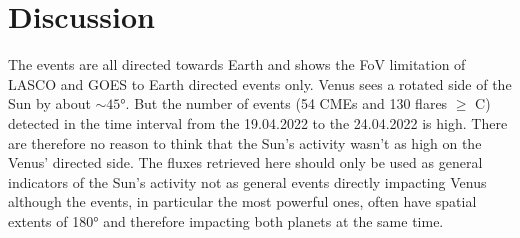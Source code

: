 \section{Discussion}

The events are all directed towards Earth and shows the FoV limitation of LASCO and GOES to Earth directed events only. Venus sees a rotated side of the Sun by about $\sim 45$°. But the number of events (54 CMEs and 130 flares $\geq$ C) detected in the time interval from the 19.04.2022 to the 24.04.2022 is high. There are therefore no reason to think that the Sun's activity wasn't as high on the Venus' directed side. The fluxes retrieved here should only be used as general indicators of the Sun's activity not as general events directly impacting Venus although the events, in particular the most powerful ones, often have spatial extents of 180° and therefore impacting both planets at the same time.
